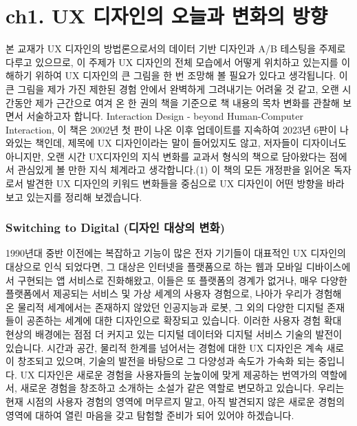 \documentclass[
  letterpaper,
]{book}
\begin{document}
\chapter{ch1. UX 디자인의 오늘과 변화의
방향}\label{ch1.-ux-uxb514uxc790uxc778uxc758-uxc624uxb298uxacfc-uxbcc0uxd654uxc758-uxbc29uxd5a5}

본 교재가 UX 디자인의 방법론으로서의 데이터 기반 디자인과 A/B 테스팅을
주제로 다루고 있으므로, 이 주제가 UX 디자인의 전체 모습에서 어떻게
위치하고 있는지를 이해하기 위하여 UX 디자인의 큰 그림을 한 번 조망해 볼
필요가 있다고 생각됩니다. 이 큰 그림을 제가 가진 제한된 경험 안에서
완벽하게 그려내기는 어려울 것 같고, 오랜 시간동안 제가 근간으로 여겨 온
한 권의 책을 기준으로 책 내용의 목차 변화를 관찰해 보면서 서술하고자
합니다. Interaction Design - beyond Human-Computer Interaction, 이 책은
2002년 첫 판이 나온 이후 업데이트를 지속하여 2023년 6판이 나와있는
책인데, 제목에 UX 디자인이라는 말이 들어있지도 않고, 저자들이 디자이너도
아니지만, 오랜 시간 UX디자인의 지식 변화를 교과서 형식의 책으로
담아왔다는 점에서 관심있게 볼 만한 지식 체계라고 생각합니다.(1) 이 책의
모든 개정판을 읽어온 독자로서 발견한 UX 디자인의 키워드 변화들을
중심으로 UX 디자인이 어떤 방향을 바라보고 있는지를 정리해 보겠습니다.

\subsection{Switching to Digital (디자인 대상의
변화)}\label{switching-to-digital-uxb514uxc790uxc778-uxb300uxc0c1uxc758-uxbcc0uxd654}

1990년대 중반 이전에는 복잡하고 기능이 많은 전자 기기들이 대표적인 UX
디자인의 대상으로 인식 되었다면, 그 대상은 인터넷을 플랫폼으로 하는 웹과
모바일 디바이스에서 구현되는 앱 서비스로 진화해왔고, 이들은 또 플랫폼의
경계가 없거나, 매우 다양한 플랫폼에서 제공되는 서비스 및 가상 세계의
사용자 경험으로, 나아가 우리가 경험해 온 물리적 세계에서는 존재하지
않았던 인공지능과 로봇, 그 외의 다양한 디지털 존재들이 공존하는 세계에
대한 디자인으로 확장되고 있습니다. 이러한 사용자 경험 확대 현상의
배경에는 점점 더 커지고 있는 디지털 데이터와 디지털 서비스 기술의 발전이
있습니다. 시간과 공간, 물리적 한계를 넘어서는 경험에 대한 UX 디자인은
계속 새로이 창조되고 있으며, 기술의 발전을 바탕으로 그 다양성과 속도가
가속화 되는 중입니다. UX 디자인은 새로운 경험을 사용자들의 눈높이에 맞게
제공하는 번역가의 역할에서, 새로운 경험을 창조하고 소개하는 소설가 같은
역할로 변모하고 있습니다. 우리는 현재 시점의 사용자 경험의 영역에
머무르지 말고, 아직 발견되지 않은 새로운 경험의 영역에 대하여 열린
마음을 갖고 탐험할 준비가 되어 있어야 하겠습니다.
\end{document}
